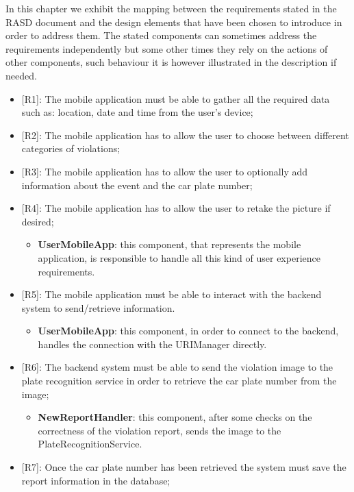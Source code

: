 In this chapter we exhibit the mapping between the requirements stated in the RASD document and the design elements that have been chosen to introduce in order to address them. The stated components can sometimes address the requirements independently but some other times they rely on the actions of other components, such behaviour it is however illustrated in the description if needed. 

\begin{itemize} 
    \item {[R1]}: The mobile application must be able to gather all the required data such as: location, date and time from the user's device;
    \item[] {[R2]}: The mobile application has to allow the user to choose between different categories of violations;
    \item[] {[R3]}: The mobile application has to allow the user to optionally add information about the event and the car plate number;
    \item[] {[R4]}: The mobile application has to allow the user to retake the picture if desired;
    \begin{itemize}
      \item \textbf{UserMobileApp}: this component, that represents the mobile application, is responsible to handle all this kind of user experience requirements.
    \end{itemize}
    \item {[R5]}: The mobile application must be able to interact with the backend system to send/retrieve information.
    \begin{itemize}
      \item \textbf{UserMobileApp}: this component, in order to connect to the backend, handles the connection with the URIManager directly.
    \end{itemize}      
    \item {[R6]}: The backend system must be able to send the violation image to the plate recognition service in order to retrieve the car plate number from the image;
    \begin{itemize}
      \item \textbf{NewReportHandler}: this component, after some checks on the correctness of the violation report, sends the image to the PlateRecognitionService.
    \end{itemize}  
    \item {[R7]}: Once the car plate number has been retrieved the system must save the report information in the database;

\end{itemize}
